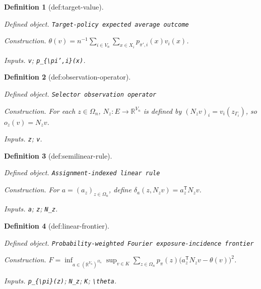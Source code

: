\documentclass{article}
\newtheorem{definition}{Definition}
\begin{document}
\begin{definition}[def:target-value]\label{def:target-value}
\par\smallskip\noindent\emph{Defined object.} \texttt{Target-\allowbreak{}policy expected average outcome}
\par\smallskip\noindent\emph{Construction.} \(\theta(v)=n^{-1}\sum_{i\in V_n}\sum_{x\in X_i}p_{\pi',i}(x)v_i(x)\).
\par\smallskip\noindent\emph{Inputs.} \texttt{v}; \texttt{p\_\allowbreak{}\{\textbackslash{}\allowbreak{}pi',\allowbreak{}i\}\allowbreak{}(x)}.
\end{definition}

\begin{definition}[def:observation-operator]\label{def:observation-operator}
\par\smallskip\noindent\emph{Defined object.} \texttt{Selector observation operator}
\par\smallskip\noindent\emph{Construction.} For each \(z\in\Omega_n\), \(N_z:E\to\mathbb R^{V_n}\) is defined by \((N_zv)_i=v_i(z_{\Gamma_i})\), so \(o_z(v)=N_zv\).
\par\smallskip\noindent\emph{Inputs.} \texttt{z}; \texttt{v}.
\end{definition}

\begin{definition}[def:semilinear-rule]\label{def:semilinear-rule}
\par\smallskip\noindent\emph{Defined object.} \texttt{Assignment-\allowbreak{}indexed linear rule}
\par\smallskip\noindent\emph{Construction.} For \(a=(a_z)_{z\in\Omega_n}\), define \(\delta_a(z,N_zv)=a_z^{\mathsf T}N_zv\).
\par\smallskip\noindent\emph{Inputs.} \texttt{a}; \texttt{z}; \texttt{N\_\allowbreak{}z}.
\end{definition}

\begin{definition}[def:linear-frontier]\label{def:linear-frontier}
\par\smallskip\noindent\emph{Defined object.} \texttt{Probability-\allowbreak{}weighted Fourier exposure-\allowbreak{}incidence frontier}
\par\smallskip\noindent\emph{Construction.} \(F=\inf_{a\in(\mathbb R^{V_n})^{\Omega_n}}\sup_{v\in K}\sum_{z\in\Omega_n}p_{\pi}(z)\bigl(a_z^{\mathsf T}N_zv-\theta(v)\bigr)^2\).
\par\smallskip\noindent\emph{Inputs.} \texttt{p\_\allowbreak{}\{\textbackslash{}\allowbreak{}pi\}\allowbreak{}(z)}; \texttt{N\_\allowbreak{}z}; \texttt{K}; \texttt{\textbackslash{}\allowbreak{}theta}.
\end{definition}
\end{document}
